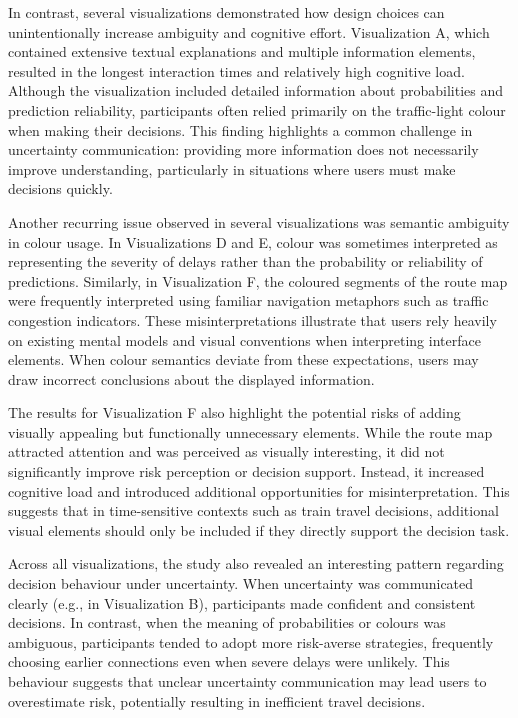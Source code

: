 \documentclass[final,journal,a4paper]{IEEEtran}
\begin{document}
In contrast, several visualizations demonstrated how design choices can unintentionally increase ambiguity and cognitive effort. Visualization A, which contained extensive textual explanations and multiple information elements, resulted in the longest interaction times and relatively high cognitive load. Although the visualization included detailed information about probabilities and prediction reliability, participants often relied primarily on the traffic-light colour when making their decisions. This finding highlights a common challenge in uncertainty communication: providing more information does not necessarily improve understanding, particularly in situations where users must make decisions quickly.

Another recurring issue observed in several visualizations was semantic ambiguity in colour usage. In Visualizations D and E, colour was sometimes interpreted as representing the severity of delays rather than the probability or reliability of predictions. Similarly, in Visualization F, the coloured segments of the route map were frequently interpreted using familiar navigation metaphors such as traffic congestion indicators. These misinterpretations illustrate that users rely heavily on existing mental models and visual conventions when interpreting interface elements. When colour semantics deviate from these expectations, users may draw incorrect conclusions about the displayed information.

The results for Visualization F also highlight the potential risks of adding visually appealing but functionally unnecessary elements. While the route map attracted attention and was perceived as visually interesting, it did not significantly improve risk perception or decision support. Instead, it increased cognitive load and introduced additional opportunities for misinterpretation. This suggests that in time-sensitive contexts such as train travel decisions, additional visual elements should only be included if they directly support the decision task.

Across all visualizations, the study also revealed an interesting pattern regarding decision behaviour under uncertainty. When uncertainty was communicated clearly (e.g., in Visualization B), participants made confident and consistent decisions. In contrast, when the meaning of probabilities or colours was ambiguous, participants tended to adopt more risk-averse strategies, frequently choosing earlier connections even when severe delays were unlikely. This behaviour suggests that unclear uncertainty communication may lead users to overestimate risk, potentially resulting in inefficient travel decisions.
\end{document}
